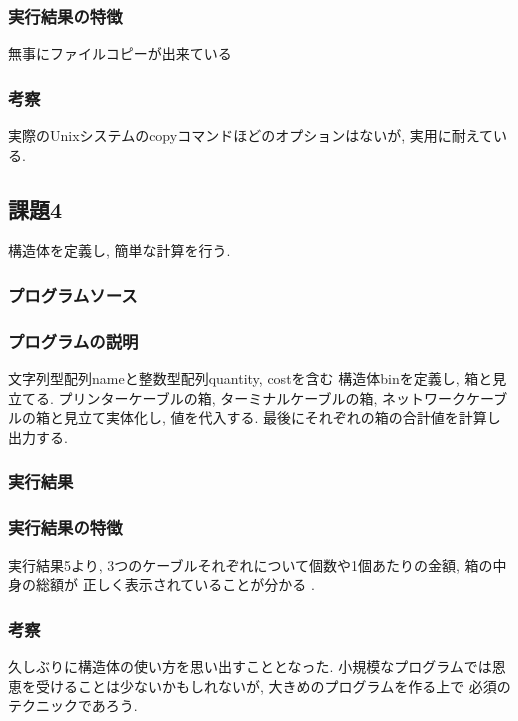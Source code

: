 \documentclass{jsarticle}
\begin{document}
            \subsubsection{実行結果の特徴}
                無事にファイルコピーが出来ている
            \subsubsection{考察}
                実際のUnixシステムのcopyコマンドほどのオプションはないが, 実用に耐えている. 
            
        \subsection{課題4}
            構造体を定義し, 簡単な計算を行う. 
            \subsubsection{プログラムソース}
                
            
            \subsubsection{プログラムの説明}
                文字列型配列nameと整数型配列quantity, costを含む
                構造体binを定義し, 箱と見立てる. 
                プリンターケーブルの箱, ターミナルケーブルの箱, ネットワークケーブルの箱と見立て実体化し, 値を代入する. 
                最後にそれぞれの箱の合計値を計算し出力する.  
            \subsubsection{実行結果}
                

            \subsubsection{実行結果の特徴}
                実行結果5より,  3つのケーブルそれぞれについて個数や1個あたりの金額, 箱の中身の総額が
                正しく表示されていることが分かる . 
            
            \subsubsection{考察}
                久しぶりに構造体の使い方を思い出すこととなった. 
                小規模なプログラムでは恩恵を受けることは少ないかもしれないが, 大きめのプログラムを作る上で
                必須のテクニックであろう. 
        
\end{document}
